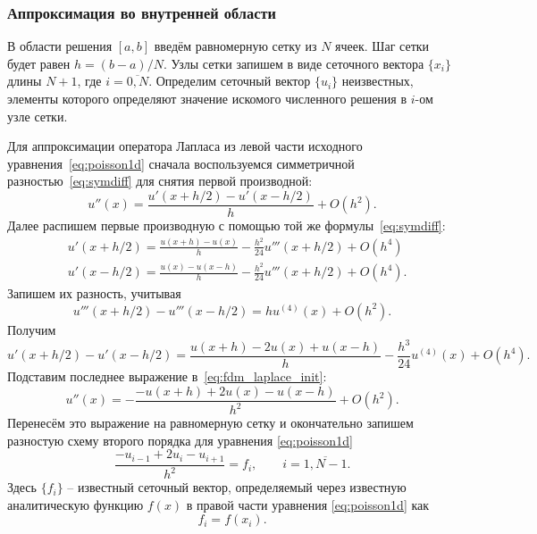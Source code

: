\subsubsection{Аппроксимация во внутренней области}

В области решения $[a,b]$ введём равномерную сетку из $N$ ячеек.
Шаг сетки будет равен $h=(b-a)/N$.
Узлы сетки запишем в виде сеточного вектора $\{x_i\}$ длины $N+1$, где $i=\overline{0,N}$.
Определим сеточный вектор $\{u_i\}$ неизвестных, элементы которого определяют значение искомого численного решения в $i$-ом узле сетки. 

Для аппроксимации оператора Лапласа из левой части исходного уравнения~\cref{eq:poisson1d} сначала
воспользуемся симметричной разностью~\cref{eq:symdiff} для снятия первой производной:
\begin{equation}
\label{eq:fdm_laplace_init}
u''(x) = \frac{u'(x+h/2) - u'(x-h/2)}{h} + O(h^2).
\end{equation}
Далее распишем первые производную с помощью той же формулы~\cref{eq:symdiff}:
\begin{align*}
& u'(x+h/2) = \frac{u(x+h) - u(x)}{h} - \frac{h^2}{24} u'''(x+h/2) + O(h^4)\\
& u'(x-h/2) = \frac{u(x) - u(x-h)}{h} - \frac{h^2}{24} u'''(x+h/2) + O(h^4).
\end{align*}
Запишем их разность, учитывая
\begin{equation*}
u'''(x+h/2) - u'''(x-h/2) = h u^{(4)}(x) + O(h^2).
\end{equation*}
Получим
\begin{equation*}
u'(x+h/2) - u'(x-h/2) = \frac{u(x+h) - 2 u(x) + u(x-h)}{h} - \frac{h^3}{24} u^{(4)}(x) + O(h^4).
\end{equation*}
Подставим последнее выражение в~\cref{eq:fdm_laplace_init}:
\begin{equation}
\label{eq:fdm_laplace_init}
u''(x) = -\frac{-u(x+h) + 2 u(x) - u(x-h)}{h^2} + O(h^2).
\end{equation}
Перенесём это выражение на равномерную сетку и окончательно запишем разностую схему второго порядка
для уравнения \cref{eq:poisson1d}
\begin{equation}
    \label{eq:poisson1d_fdm}
    \frac{-u_{i-1} + 2u_{i} - u_{i+1}}{h^2} = f_i, \qquad i=\overline{1,N-1}.
\end{equation}
Здесь $\{f_i\}$ -- известный сеточный вектор, определяемый через известную
аналитическую функцию $f(x)$ в правой части уравнения \cref{eq:poisson1d} как
\begin{equation}
    \label{eq:poisson1d_fdm2}
    f_i = f(x_i).
\end{equation}

